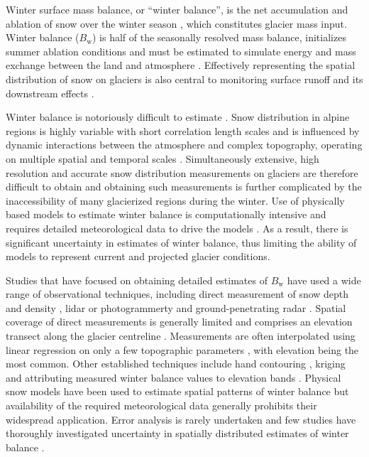 \documentclass[twocolumn, letterpaper]{igs}
\begin{document}
Winter surface mass balance, or ``winter balance'', is the net accumulation and ablation of snow over the winter season \citep{Cogley2011}, which constitutes glacier mass input. Winter balance ($B_\mathrm{w}$) is half of the seasonally resolved mass balance, initializes summer ablation conditions and must be estimated to simulate energy and mass exchange between the land and atmosphere \citep[e.g.][]{Hock2005,Reveillet2016}. Effectively representing the spatial distribution of snow on glaciers is also central to monitoring surface runoff and its downstream effects \citep[e.g.][]{Clark2011}.

Winter balance is notoriously difficult to estimate \citep[e.g.][]{Dadic2010, Cogley2011}. Snow distribution in alpine regions is highly variable with short correlation length scales \citep[e.g.][]{Anderton2004, Egli2011, Grunewald2010, Helbig2017, Lopez2011, Lopez2013, Machguth2006, Marshall2006} and is influenced by dynamic interactions between the atmosphere and complex topography, operating on multiple spatial and temporal scales \citep[e.g.][]{Barry1992, Liston2006, Clark2011,Scipion2013}. Simultaneously extensive, high resolution and accurate snow distribution measurements on glaciers are therefore difficult to obtain \citep[e.g.][]{Cogley2011, McGrath2015} and obtaining such measurements is further complicated by the inaccessibility of many glacierized regions during the winter. Use of physically based models to estimate winter balance is computationally intensive and requires detailed meteorological data to drive the models \citep{Dadic2010}. As a result, there is significant uncertainty in estimates of winter balance, thus limiting the ability of models to represent current and projected glacier conditions.

Studies that have focused on obtaining detailed estimates of $B_\mathrm{w}$ have used a wide range of observational techniques, including direct measurement of snow depth and density \citep[e.g.][]{Cullen2017}, lidar or photogrammerty \citep[e.g.][]{Sold2013} and ground-penetrating radar \citep[e.g.][]{Machguth2006, Gusmeroli2014, McGrath2015}. Spatial coverage of direct measurements is generally limited and comprises an elevation transect along the glacier centreline \citep[e.g.][]{Kaser2003}. Measurements are often interpolated using linear regression on only a few topographic parameters \citep[e.g.][]{MacDougall2011}, with elevation being the most common. Other established techniques include hand contouring \citep[e.g.][]{Tangborn1975}, kriging \citep[e.g.][]{Hock1999} and attributing measured winter balance values to elevation bands \citep[e.g.][]{Thibert2008}. Physical snow models have been used to estimate spatial patterns of winter balance \citep[e.g.][]{Mott2008, Schuler2008, Dadic2010} but availability of the required meteorological data generally prohibits their widespread application. Error analysis is rarely undertaken and few studies have thoroughly investigated uncertainty in spatially distributed estimates of winter balance  \citep[c.f.][]{Schuler2008}. 
\end{document}
